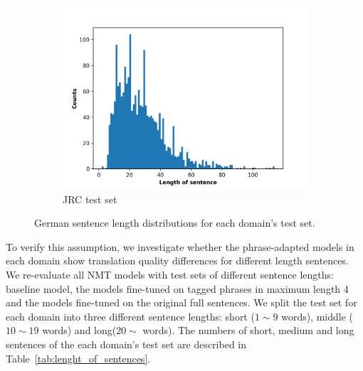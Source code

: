 \begin{figure}[hb!]
\begin{subfigure}{.32\textwidth}
  \includegraphics[width=1\linewidth]{images/JRC_length.png}
  \caption{JRC test set}
  \label{fig:sub2}
\end{subfigure}
\caption{German sentence length distributions for each domain's test set. }
\label{fig:Lengthofsentences}
\end{figure}

To verify this assumption, we investigate whether the phrase-adapted models in each domain show translation quality differences for different length sentences. 
We re-evaluate all NMT models with test sets of different sentence lengths: baseline model, the models fine-tuned on tagged phrases in maximum length 4 and the models fine-tuned on the original full sentences. 
We split the test set for each domain into three different sentence lengths: short ($1\sim9$ words), middle ($10\sim19$ words) and long($20\sim$ words). The numbers of short, medium and long sentences of the each domain's test set are described in Table~\ref{tab:lenght_of_sentences}. 

